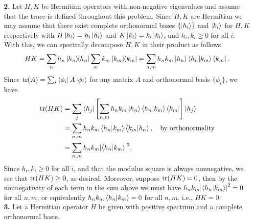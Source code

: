 \documentclass{article}
\theoremstyle{definition}
\newcommand{\lb}{\left[}
\newcommand{\rb}{\right]}
\begin{document}
\noindent \textbf{2.} Let $H,K$ be Hermitian operators with non-negative eigenvalues and assume that  the trace is defined throughout this problem. Since $H,K$ are Hermitian we may assume that there exist complete orthonormal bases $\{ \ket{h_i}\}$ and $\ket{k_i}$ for $H,K$ respectively with $H\ket{h_i} = h_i \ket{h_i}$ and $K\ket{k_i} = k_i \ket{k_i}$, and $h_i,k_i \geq 0$ for all $i$. With this, we can spectrally decompose $H,K$ in their product as follows
\begin{align*}
HK = \sum_n h_n \ketbra{h_n}\sum_m k_m \ketbra{k_m} = \sum_{n,m} h_n k_m \ket{h_n}\bra{h_n} \ket{k_m}\bra{k_m}.
\end{align*}
Since $\tr(A) = \sum_i \bra{\phi_i} A \ket{\phi_i}$ for any matrix $A$ and orthonormal basis $\{ \phi_i\}$, we have
\begin{align*}
\tr(HK) &= \sum_j \bra{h_j} \lb  \sum_{n,m} h_n k_m \ket{h_n}\bra{h_n} \ket{k_m}\bra{k_m} \rb    \ket{h_j} \\
&= \sum_{n,m} h_n k_m \bra{h_n} \ket{k_m} \bra{k_m}\ket{h_n}, \quad \text{by orthonormality}\\
&= \sum_{n,m} h_n k_m \abs{\bra{h_n} \ket{k_m}}^2.
\end{align*}
Since $h_i,k_i \geq 0$ for all $i$, and that the modulus square is always nonnegative, we see that $\tr(HK) \geq 0$, as desired. Moreover, suppose $\tr(HK) = 0$, then by the nonnegativity of each term in the sum above we must have $h_n k_m \abs{\bra{h_n}\ket{k_m}}^2 = 0$ for all $n,m$, or equivalently $h_nk_m \bra{h_n}\ket{k_m} = 0$ for all $n,m$, i.e., $HK=0$.\\













\noindent \textbf{3.} Let a Hermitian operator $H$ be given with positive spectrum and a complete orthonormal basis. 
\end{document}
